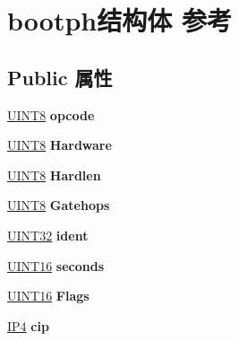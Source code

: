 \hypertarget{structbootph}{}\section{bootph结构体 参考}
\label{structbootph}
\subsection*{Public 属性}
\begin{DoxyCompactItemize}
\item 
\mbox{\label{structbootph_abce3347578fd677c20cdeefd172f0e75}} 
\hyperlink{_processor_bind_8h_ab27e9918b538ce9d8ca692479b375b6a}{U\+I\+N\+T8} {\bfseries opcode}
\item 
\mbox{\label{structbootph_a18ea85e3caff1f706245b1c360ff7e53}} 
\hyperlink{_processor_bind_8h_ab27e9918b538ce9d8ca692479b375b6a}{U\+I\+N\+T8} {\bfseries Hardware}
\item 
\mbox{\label{structbootph_a66474c3eed933d3929fb377bd888d155}} 
\hyperlink{_processor_bind_8h_ab27e9918b538ce9d8ca692479b375b6a}{U\+I\+N\+T8} {\bfseries Hardlen}
\item 
\mbox{\label{structbootph_aad9af121bef387d66f8c7763bda52bdb}} 
\hyperlink{_processor_bind_8h_ab27e9918b538ce9d8ca692479b375b6a}{U\+I\+N\+T8} {\bfseries Gatehops}
\item 
\mbox{\label{structbootph_ae5551a2da7b8969fb1fb605db1c4ed93}} 
\hyperlink{_processor_bind_8h_ae1e6edbbc26d6fbc71a90190d0266018}{U\+I\+N\+T32} {\bfseries ident}
\item 
\mbox{\label{structbootph_a88901272ba11ad2074037f7c72f46274}} 
\hyperlink{_processor_bind_8h_a09f1a1fb2293e33483cc8d44aefb1eb1}{U\+I\+N\+T16} {\bfseries seconds}
\item 
\mbox{\label{structbootph_adb29e9668665b317d58d985fcc8d8c7a}} 
\hyperlink{_processor_bind_8h_a09f1a1fb2293e33483cc8d44aefb1eb1}{U\+I\+N\+T16} {\bfseries Flags}
\item 
\mbox{\label{structbootph_ad1f66e97be2527e3d175f3c41cf71fc0}} 
\hyperlink{union_i_p4}{I\+P4} {\bfseries cip}

\end{DoxyCompactItemize}

